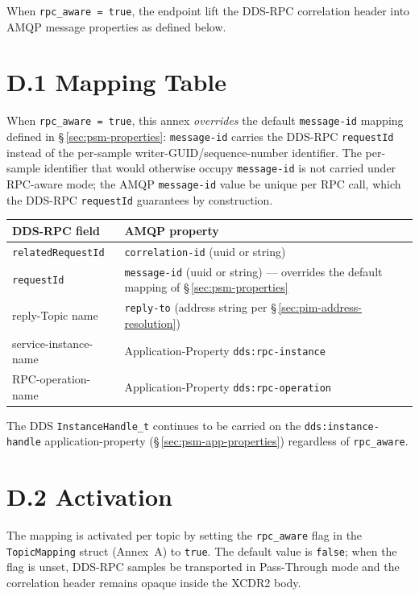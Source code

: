 \documentclass{../styles/zerodds-vendor-spec}
\begin{document}
When \texttt{rpc\_aware = true}, the endpoint  lift
the DDS-RPC correlation header into AMQP message properties as
defined below.

\section*{D.1 Mapping Table}

When \texttt{rpc\_aware = true}, this annex \emph{overrides} the
default \texttt{message-id} mapping defined in
\S\,\ref{sec:psm-properties}: \texttt{message-id} carries the
DDS-RPC \texttt{requestId} instead of the per-sample
writer-GUID/sequence-number identifier. The per-sample identifier
that would otherwise occupy \texttt{message-id} is not carried
under RPC-aware mode; the AMQP \texttt{message-id} value
 be unique per RPC call, which the DDS-RPC
\texttt{requestId} guarantees by construction.

\begin{longtable}{p{4.5cm}p{8.0cm}}
  \toprule
  \textbf{DDS-RPC field} & \textbf{AMQP property} \\
  \midrule
  \endhead
  \texttt{relatedRequestId} & \texttt{correlation-id} (uuid or string) \\
  \texttt{requestId}        & \texttt{message-id} (uuid or string) — overrides the default mapping of \S\,\ref{sec:psm-properties} \\
  reply-Topic name           & \texttt{reply-to} (address string per \S\,\ref{sec:pim-address-resolution}) \\
  service-instance-name      & Application-Property \texttt{dds:rpc-instance} \\
  RPC-operation-name         & Application-Property \texttt{dds:rpc-operation} \\
  \bottomrule
\end{longtable}

The DDS \texttt{InstanceHandle\_t} continues to be carried on the
\texttt{dds:instance-handle} application-property
(\S\,\ref{sec:psm-app-properties}) regardless of \texttt{rpc\_aware}.

\section*{D.2 Activation}

The mapping is activated per topic by setting the
\texttt{rpc\_aware} flag in the \texttt{TopicMapping} struct
(Annex~A) to \texttt{true}. The default value is
\texttt{false}; when the flag is unset, DDS-RPC samples
 be transported in Pass-Through mode and the
correlation header remains opaque inside the XCDR2 body.
\end{document}
